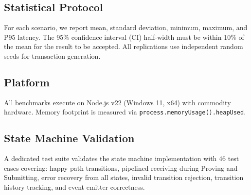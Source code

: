 \subsection{Statistical Protocol}

For each scenario, we report mean, standard deviation, minimum, maximum,
and P95 latency. The 95\% confidence interval (CI) half-width must be
within 10\% of the mean for the result to be accepted. All replications
use independent random seeds for transaction generation.

\subsection{Platform}

All benchmarks execute on Node.js v22 (Windows 11, x64) with commodity
hardware. Memory footprint is measured via \texttt{process.memoryUsage().heapUsed}.

\subsection{State Machine Validation}

A dedicated test suite validates the state machine implementation with
46 test cases covering: happy path transitions, pipelined receiving during
Proving and Submitting, error recovery from all states, invalid transition
rejection, transition history tracking, and event emitter correctness.
